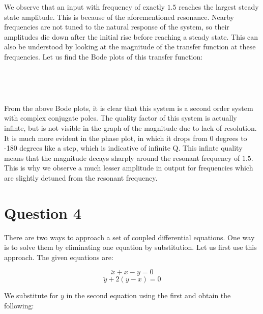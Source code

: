 \documentclass[11pt]{article}
\begin{document}
	
We observe that an input with frequency of exactly \(1.5\) reaches the
largest steady state amplitude. This is because of the aforementioned
resonance. Nearby frequencies are not tuned to the natural response of
the system, so their amplitudes die down after the initial rise before
reaching a steady state. This can also be understood by looking at the
magnitude of the transfer function at these frequencies. Let us find the
Bode plots of this transfer function:
	

    \begin{center}
    \end{center}
    { \hspace*{\fill} \\}
    
    \begin{center}
    \end{center}
    { \hspace*{\fill} \\}
    
	
		
    From the above Bode plots, it is clear that this system is a second
order system with complex conjugate poles. The quality factor of this
system is actually infinte, but is not visible in the graph of the
magnitude due to lack of resolution. It is much more evident in the
phase plot, in which it drops from 0 degrees to -180 degrees like a
step, which is indicative of infinite Q. This infinte quality means that
the magnitude decays sharply around the resonant frequency of \(1.5\).
This is why we observe a much lesser amplitude in output for frequencies
which are slightly detuned from the resonant frequency.

	

	
		
    \section{Question 4}\label{question-4}

There are two ways to approach a set of coupled differential equations.
One way is to solve them by eliminating one equation by substitution.
Let us first use this approach. The given equations are:

\[\ddot{x} + x -y = 0\] \[\ddot{y} + 2(y -x) = 0\]

We substitute for \(y\) in the second equation using the first and
obtain the following:
\end{document}
